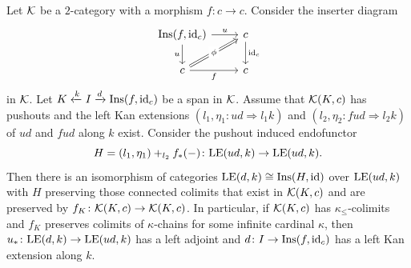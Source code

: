 \begin{lemma}\label{lem:KanExtensionInserter}
Let $\mathcal{K}$ be a $2$-category with a morphism $f\colon c\to c$. Consider the inserter diagram
$$
\begin{tikzcd}
{\Ins(f,\id_c)} \arrow[d, "u"'] \arrow[r, "u"] & c \arrow[d, "\id_c"] \\
c \arrow[r, "f"'] \arrow[ru, "\phi" description, Rightarrow] & c
\end{tikzcd}
$$
in $\mathcal{K}$. Let $K\xleftarrow{k}I\xrightarrow{d} \mathrm{Ins}(f,\mathrm{id}_c)$ be a span in $\mathcal{K}$. Assume that $\mathcal{K}(K,c)$ has pushouts and the left Kan extensions $(l_1,\eta_1\colon ud\Rightarrow l_1k)$ and $(l_2,\eta_2\colon fud\Rightarrow l_2k)$ of $ud$ and $fud$ along $k$ exist. Consider the pushout induced endofunctor
$$
H = (l_1,\eta_1)+_{l_2} f_*(-)\colon \mathrm{LE}(ud,k)\to \mathrm{LE}(ud,k).
$$
Then there is an isomorphism of categories $\mathrm{LE}(d,k) \cong \mathrm{Ins}(H,\mathrm{id})$ over $\mathrm{LE}(ud,k)$ with $H$ preserving those connected colimits that exist in $\mathcal{K}(K,c)$ and are preserved by $f_K\colon \mathcal{K}(K,c)\to \mathcal{K}(K,c)$. In particular, if $\mathcal{K}(K,c)$ has $\kappa_\leq$-colimits and $f_K$ preserves colimits of $\kappa$-chains for some infinite cardinal $\kappa$, then $u_*\colon \mathrm{LE}(d,k)\to \mathrm{LE}(ud,k)$ has a left adjoint and $d\colon I\to \mathrm{Ins}(f,\mathrm{id}_c)$ has a left Kan extension along $k$.
\end{lemma}

